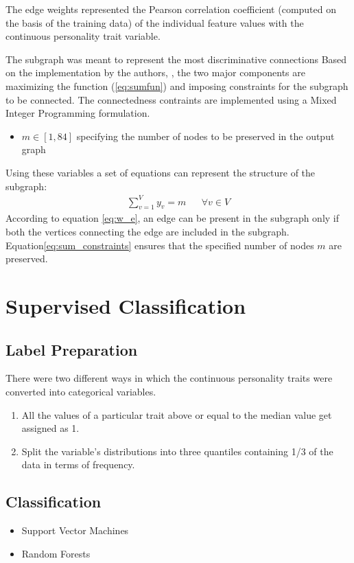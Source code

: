 \documentclass[msthesis.tex]{subfiles}
\begin{document}
The edge weights represented the Pearson correlation coefficient (computed on the basis of the training data) of the individual feature values with the continuous personality trait variable. 

The subgraph was meant to represent the most discriminative connections  Based on the implementation by the authors, \cite{DBLP:journals/corr/LobodaAS16}, the two major components are maximizing the function (\ref{eq:sumfun}) and imposing constraints for the subgraph to be connected. The connectedness contraints are implemented using a Mixed Integer Programming formulation. 

\begin{itemize}
 \item $m \in [1,84]$ specifying the number of nodes to be preserved in the output graph
\end{itemize}
Using these variables a set of equations can represent the structure of the subgraph:
\begin{align}
    \label{eq:sum_constraints}
    \sum_{v=1}^{V} y_v = m        &&  \forall v \in V
\end{align}
According to  equation \ref{eq:w_e}, an edge can be present in the subgraph only if both the vertices connecting the edge are included in the subgraph. Equation\ref{eq:sum_constraints} ensures that the specified number of nodes $m$ are preserved. 


\section{Supervised Classification}

\subsection{Label Preparation}
\label{sec:label_preparation}
There were two different ways in which the continuous personality traits were converted into categorical variables. 
\begin{enumerate}
    \item All the values of a particular trait above or equal to the median value get assigned as 1. 
    \item Split the variable's distributions into three quantiles containing 1/3 of the data in terms of frequency. 
\end{enumerate}

\subsection{Classification}
\begin{itemize}
    \item Support Vector Machines
    \item Random Forests

\end{itemize}
\end{document}
